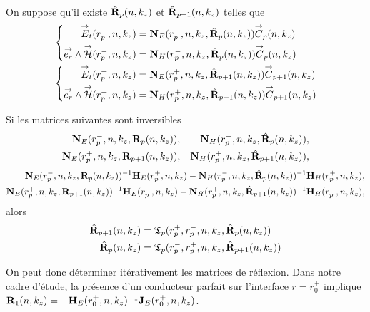     \begin{prop}%
      \label{prop:cylindre:synthese:reflexion}{}~

      On suppose qu'il existe \(\hat{\mathbf{R}}_{p}(n,k_z)\) et \(\hat{\mathbf{R}}_{p+1}(n,k_z)\) telles que 
      \begin{align*}
      &\left\lbrace\begin{aligned}
        {\overset{\rightarrow}{E}}_t(r_{p}^-,n,k_z) &= \mathbf{N}_{E}(r_p^-,n,k_z,\hat{\mathbf{R}}_{p}(n,k_z)){\overset{\rightarrow}{C}}_{p}(n,k_z)
        \\
        {\overset{\rightarrow}{e_r}}\wedge{\overset{\rightarrow}{\mathcal{H}}}(r_{p}^-,n,k_z) &= \mathbf{N}_{H}(r_p^-,n,k_z,\hat{\mathbf{R}}_{p}(n,k_z)){\overset{\rightarrow}{C}}_{p}(n,k_z)
        \end{aligned}
      \right.
      \\
      &\left\lbrace\begin{aligned}
        {\overset{\rightarrow}{E}}_t(r_{p}^+,n,k_z) &= \mathbf{N}_{E}(r_p^+,n,k_z,\hat{\mathbf{R}}_{p+1}(n,k_z)){\overset{\rightarrow}{C}}_{p+1}(n,k_z)
        \\
        {\overset{\rightarrow}{e_r}}\wedge{\overset{\rightarrow}{\mathcal{H}}}(r_{p}^+,n,k_z) &= \mathbf{N}_{H}(r_p^+,n,k_z,\hat{\mathbf{R}}_{p+1}(n,k_z)){\overset{\rightarrow}{C}}_{p+1}(n,k_z)
        \end{aligned}
      \right.      
      \end{align*}

      Si les matrices suivantes sont inversibles
      \begin{align*}
        \mathbf{N}_{E}(r_p^-,n,k_z,\mathbf{R}_{p}(n,k_z)), && \mathbf{N}_{H}(r_p^-,n,k_z,\hat{\mathbf{R}}_{p}(n,k_z)),
        \\
        \mathbf{N}_{E}(r_p^+,n,k_z,\mathbf{R}_{p+1}(n,k_z)), && \mathbf{N}_{H}(r_p^+,n,k_z,\hat{\mathbf{R}}_{p+1}(n,k_z)),
      \end{align*}
      \begin{align*}
        \mathbf{N}_{E}(r_p^-,n,k_z,\mathbf{R}_{p}(n,k_z))^{-1}\mathbf{H}_{E}(r_p^+,n,k_z) - \mathbf{N}_{H}(r_p^-,n,k_z,\hat{\mathbf{R}}_{p}(n,k_z))^{-1}\mathbf{H}_{H}(r_p^+,n,k_z),
        \\
        \mathbf{N}_{E}(r_p^+,n,k_z,\mathbf{R}_{p+1}(n,k_z))^{-1}\mathbf{H}_{E}(r_p^-,n,k_z) - \mathbf{N}_{H}(r_p^+,n,k_z,\hat{\mathbf{R}}_{p+1}(n,k_z))^{-1}\mathbf{H}_{H}(r_p^-,n,k_z),
      \end{align*}
      alors
      \begin{align*}
        \hat{\mathbf{R}}_{p+1}(n,k_z) &= \mathfrak{T}_p(r_p^+,r_p^-,n,k_z,\hat{\mathbf{R}}_{p}(n,k_z))
        \\
        \hat{\mathbf{R}}_{p}(n,k_z) &= \mathfrak{T}_p(r_p^-,r_p^+,n,k_z,\hat{\mathbf{R}}_{p+1}(n,k_z))
      \end{align*}
    \end{prop}

    On peut donc déterminer itérativement les matrices de réflexion. Dans notre cadre d'étude, la présence d'un conducteur parfait sur l'interface \(r=r_0^+\) implique \(\mathbf{R}_{1}(n,k_z) = -\mathbf{H}_E(r_0^+,n,k_z)^{-1}\mathbf{J}_E(r_0^+,n,k_z)\).

